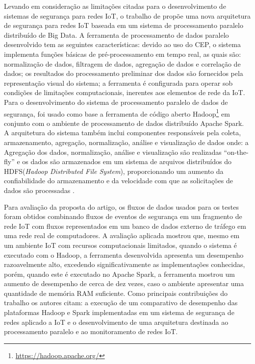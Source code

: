 \documentclass[ti,table]{texufpel} %
\begin{document}
     

    Levando em consideração as limitações citadas para o desenvolvimento de sistemas de segurança para redes IoT, o trabalho de \cite{art8kotenko2017parallel} propõe uma nova arquitetura de segurança para redes IoT baseada em um sistema de processamento paralelo distribuído de Big Data. A ferramenta de processamento de dados paralelo desenvolvido tem as seguintes características: devido ao uso do CEP, o sistema implementa funções básicas de pré-processamento em tempo real, as quais são: normalização de dados, filtragem de dados, agregação de dados e correlação de dados; os resultados do processamento preliminar dos dados são fornecidos pela representação visual do sistema; a ferramenta é configurada para operar sob condições de limitações computacionais, inerentes aos elementos de rede da IoT. Para o desenvolvimento do sistema de processamento paralelo de dados de segurança, foi usado como base a ferramenta de código aberto Hadoop\footnote{\url{https://hadoop.apache.org/}} em conjunto com o ambiente de processamento de dados distribuído Apache Spark. A arquitetura do sistema também inclui componentes responsáveis pela coleta, armazenamento, agregação, normalização, análise e visualização de dados onde: a Agregação dos dados, normalização, análise e visualização são realizadas ``on-the-fly'' e os dados são armazenados em um sistema de arquivos distribuídos do HDFS(\textit{Hadoop Distributed File System}), proporcionando um aumento da confiabilidade do armazenamento e da velocidade com que as solicitações de dados são processadas \cite{art8kotenko2017parallel}. 

     

  

    Para avaliação da proposta do artigo, os fluxos de dados usados para os testes foram obtidos combinando fluxos de eventos de segurança em um fragmento de rede IoT com fluxos representados em um banco de dados externo de tráfego em uma rede real de computadores. A avaliação aplicada mostrou que, mesmo em um ambiente IoT com recursos computacionais limitados, quando o sistema é executado com o Hadoop, a ferramenta desenvolvida apresenta um desempenho razoavelmente alto, excedendo significativamente as implementações conhecidas, porém, quando este é executado no Apache Spark, a ferramenta mostrou um aumento de desempenho de cerca de dez vezes, caso o ambiente apresentar uma quantidade de memória RAM suficiente. Como principais contribuições do trabalho os autores citam: a execução de um comparativo de desempenho das plataformas Hadoop e Spark implementadas em um sistema de segurança de redes aplicado a IoT e o desenvolvimento de uma arquitetura destinada ao processamento paralelo e ao monitoramento de redes IoT.  
\end{document}
